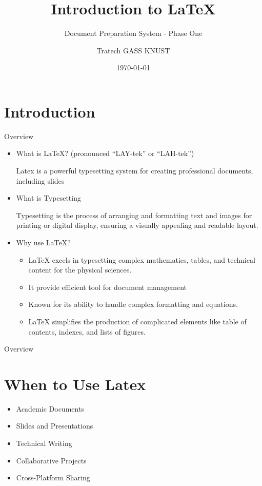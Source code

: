 \documentclass{beamer}
\title{Introduction to LaTeX}
\subtitle{Document Preparation System - Phase One}
\author{Tratech GASS KNUST}
\date{\today}
\begin{document}
	\maketitle
	\tableofcontents
	
	\section{Introduction}
	\begin{frame}{Overview}
		\begin{itemize}
			
			\item What is LaTeX? (pronounced “LAY-tek” or “LAH-tek”) \par \pause
			\small Latex is a powerful typesetting system for creating professional documents, including slides \pause \\ [10pt]
			
			\item What is Typesetting \par \pause
			Typesetting is the process of arranging and formatting text and images for printing or digital display, ensuring a visually appealing and readable layout. \pause
			
			\item Why use LaTeX?
			\begin{itemize}
				\item LaTeX excels in typesetting complex mathematics, tables, and technical content for the physical sciences.
				\item It provide efficient tool for document management
				\item Known for its ability to handle complex formatting and equations.
				\item LaTeX simplifies the production of complicated elements like table of contents, indexes, and lists of figures.
			\end{itemize}
			

		\end{itemize}
	\end{frame}	
	
	\begin{frame}{Overview}
		\section*{When to Use Latex}
		
		\begin{itemize}
			\item Academic Documents
			\item Slides and Presentations
			\item Technical Writing
			\item Collaborative Projects
			\item Cross-Platform Sharing
		\end{itemize}
	\end{frame}
	
\end{document}
